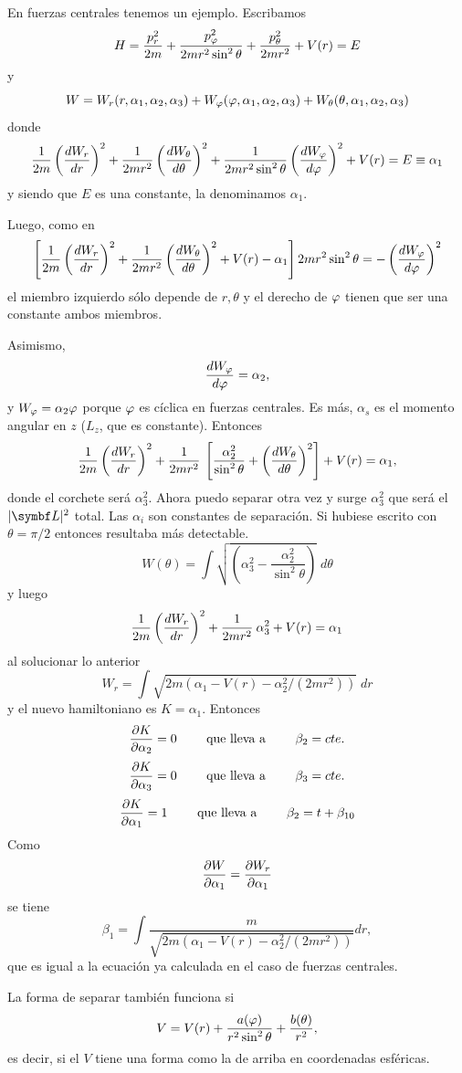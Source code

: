 \documentclass[10pt,oneside]{CBFT_book}
\begin{document}
En fuerzas centrales tenemos un ejemplo. Escribamos
\[
	H = \frac{p_r^2}{2m} + \frac{p_\varphi^2}{2mr^2\sin^2\theta} + \frac{p_\theta^2}{2mr^2} + V(r) = E
\]
y
\[
	W = W_r(r,\alpha_1,\alpha_2,\alpha_3) + W_\varphi(\varphi,\alpha_1,\alpha_2,\alpha_3) + 
		W_\theta(\theta,\alpha_1,\alpha_2,\alpha_3)
\]
donde
\[
	\frac{1}{2m} \left( \frac{d^{\hspace{-0.05em}} {W_r}}{d {r}^{\hspace{-0.05em}}} \right)^2 + \frac{1}{2mr^2} \left( \frac{d^{\hspace{-0.05em}} {W_\theta}}{d {\theta}^{\hspace{-0.05em}}} \right)^2 + \frac{1}{2mr^2\sin^2\theta} \left( \frac{d^{\hspace{-0.05em}} {W_\varphi}}{d {\varphi}^{\hspace{-0.05em}}} \right)^2
	+ V(r)  = E \equiv \alpha_1
\]
y siendo que $E$ es una constante, la denominamos $\alpha_1$.

Luego, como en 
\[
	\left[\frac{1}{2m} \left( \frac{d^{\hspace{-0.05em}} {W_r}}{d {r}^{\hspace{-0.05em}}} \right)^2 + \frac{1}{2mr^2} \left( \frac{d^{\hspace{-0.05em}} {W_\theta}}{d {\theta}^{\hspace{-0.05em}}} \right)^2 + V(r) - \alpha_1 \right] 
	2 m r^2 \sin^2\theta = - \left( \frac{d^{\hspace{-0.05em}} {W_\varphi}}{d {\varphi}^{\hspace{-0.05em}}} \right)^2
\]
el miembro izquierdo sólo depende de $r,\theta$ y el derecho de $\varphi$ tienen que ser una constante ambos
miembros.

Asimismo,
\[
	\frac{d^{\hspace{-0.05em}} {W_\varphi}}{d {\varphi}^{\hspace{-0.05em}}} = \alpha_2,
\]
y $W_\varphi = \alpha_2 \varphi$ porque $\varphi$ es cíclica en fuerzas centrales. Es más, $\alpha_s$ es el momento angular
en $z$ ($L_z$, que es constante).
Entonces
\[
	\frac{1}{2m} \left( \frac{d^{\hspace{-0.05em}} {W_r}}{d {r}^{\hspace{-0.05em}}} \right)^2 + \frac{1}{2mr^2} \:
	\left[ \frac{\alpha_2^2}{\sin^2\theta} + \left( \frac{d^{\hspace{-0.05em}} {W_\theta}}{d {\theta}^{\hspace{-0.05em}}} \right)^2 \right]  + V(r) = \alpha_1,
\]
donde el corchete será $\alpha_3^2$. Ahora puedo separar otra vez y surge $\alpha_3^2$ que será el $|\vb{L}|^2$ total.
Las $\alpha_i$ son constantes de separación.
Si hubiese escrito con $\theta = \pi / 2$ entonces resultaba más detectable.
\[
	W(\theta) = \int \sqrt{ \left( \alpha_3^2 - \frac{\alpha_2^2}{\sin^2\theta} \right) } \; d\theta
\]
y luego
\[
	\frac{1}{2m} \left( \frac{d^{\hspace{-0.05em}} {W_r}}{d {r}^{\hspace{-0.05em}}} \right)^2 + \frac{1}{2mr^2} \: \alpha_3^2 + V(r) = \alpha_1
\]
al solucionar lo anterior
\[
	W_r = \int \sqrt{ 2 m ( \alpha_1 - V(r) - \alpha_2^2 / (2mr^2) ) } \; dr
\]
y el nuevo hamiltoniano es $ K = \alpha_1 $. Entonces
\[
	\frac{\partial^{\hspace{-0.05em}} {K}}{\partial {\alpha_2}^{\hspace{-0.05em}}} = 0 \qquad \text{ que lleva a } \qquad \beta_2 = cte.
\]
\[
	\frac{\partial^{\hspace{-0.05em}} {K}}{\partial {\alpha_3}^{\hspace{-0.05em}}} = 0 \qquad \text{ que lleva a } \qquad \beta_3 = cte.
\]
\[
	\frac{\partial^{\hspace{-0.05em}} {K}}{\partial {\alpha_1}^{\hspace{-0.05em}}} = 1 \qquad \text{ que lleva a } \qquad \beta_2 = t + \beta_{10}
\]
Como
\[
	\frac{\partial^{\hspace{-0.05em}} {W}}{\partial {\alpha_1}^{\hspace{-0.05em}}} = \frac{\partial^{\hspace{-0.05em}} {W_r}}{\partial {\alpha_1}^{\hspace{-0.05em}}}
\]
se tiene 
\[
	\beta_1 = \int \frac{m}{\sqrt{ 2 m ( \alpha_1 - V(r) - \alpha_2^2 / (2mr^2) ) }} dr,
\]
que es igual a la ecuación ya calculada en el caso de fuerzas centrales.

La forma de separar también funciona si
\[
	V = V(r) + \frac{a(\varphi)}{r^2 \sin ^2 \theta} + \frac{b(\theta)}{r^2},
\]
es decir, si el $V$ tiene una forma como la de arriba en coordenadas esféricas.
\end{document}

